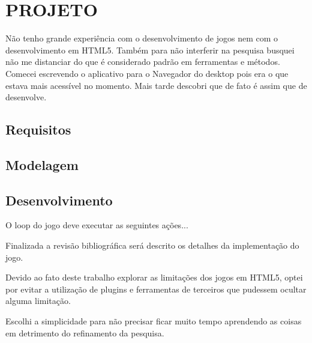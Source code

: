 \documentclass[
12pt,
a4paper,
portuges,
draft
]{report}
\begin{document}
\chapter{PROJETO}
\thispagestyle{myheadings}

Não tenho grande experiência com o desenvolvimento de jogos nem com
o desenvolvimento em HTML5. Também para não interferir na pesquisa
busquei não me distanciar do que é considerado padrão em ferramentas
e métodos.
Comecei escrevendo o aplicativo para o Navegador do desktop pois era o
que estava mais acessível no momento. Mais tarde descobri que de fato
é assim que de desenvolve.

\section{Requisitos}
\section{Modelagem}
\section{Desenvolvimento}

O loop do jogo deve executar as seguintes ações...

Finalizada a revisão bibliográfica será descrito os detalhes da implementação do jogo.

Devido ao fato deste trabalho explorar as limitações dos jogos em
HTML5, optei por evitar a utilização de plugins e ferramentas de
terceiros que pudessem ocultar alguma limitação.

Escolhi a simplicidade para não precisar ficar muito tempo aprendendo
as coisas em detrimento do refinamento da pesquisa.
\end{document}
